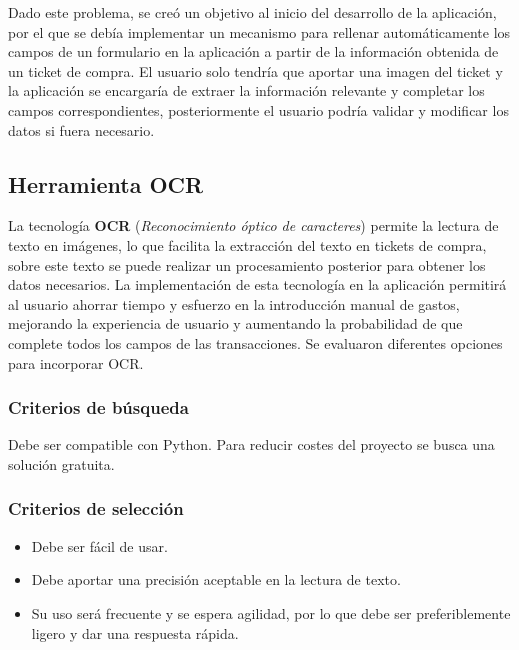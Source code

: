 Dado este problema, se creó un objetivo al inicio del desarrollo de la aplicación, por el que se debía implementar un mecanismo para rellenar automáticamente los campos de un formulario en la aplicación a partir de la información obtenida de un ticket de compra. El usuario solo tendría que aportar una imagen del ticket y la aplicación se encargaría de extraer la información relevante y completar los campos correspondientes, posteriormente el usuario podría validar y modificar los datos si fuera necesario.

\subsection{Herramienta OCR}
La tecnología \textbf{OCR} (\textit{Reconocimiento óptico de caracteres}) permite la lectura de texto en imágenes, lo que facilita la extracción del texto en tickets de compra, sobre este texto se puede realizar un procesamiento posterior para obtener los datos necesarios. La implementación de esta tecnología en la aplicación permitirá al usuario ahorrar tiempo y esfuerzo en la introducción manual de gastos, mejorando la experiencia de usuario y aumentando la probabilidad de que complete todos los campos de las transacciones. Se evaluaron diferentes opciones para incorporar OCR\cite{govindaraju2009guide}.

\subsubsection{Criterios de búsqueda}
Debe ser compatible con Python. Para reducir costes del proyecto se busca una solución gratuita. 

\subsubsection{Criterios de selección}
\begin{itemize}
    \item Debe ser fácil de usar.
    \item Debe aportar una precisión aceptable en la lectura de texto.
    \item Su uso será frecuente y se espera agilidad, por lo que debe ser preferiblemente ligero y dar una respuesta rápida.
\end{itemize}

